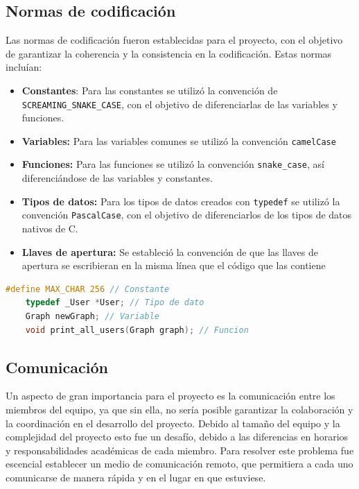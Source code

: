 \documentclass[9pt,letterpaper,onecolumn]{rho-class/rho}
\begin{document}
\subsection{Normas de codificación}
Las normas de codificación fueron establecidas para el proyecto, con el objetivo de garantizar la coherencia y la consistencia en la codificación. Estas normas incluían:

\begin{itemize}
	\item \textbf{Constantes}: Para las constantes se utilizó la convención de \texttt{SCREAMING\_SNAKE\_CASE}, con el objetivo de diferenciarlas de las variables y funciones.
	\item \textbf{Variables:} Para las variables comunes se utilizó la convención \texttt{camelCase}
	\item \textbf{Funciones:} Para las funciones se utilizó la convención \texttt{snake\_case}, así diferenciándose de las variables y constantes.
	\item \textbf{Tipos de datos:} Para los tipos de datos creados con \texttt{typedef} se utilizó la convención \texttt{PascalCase}, con el objetivo de diferenciarlos de los tipos de datos nativos de C.
	\item \textbf{Llaves de apertura:} Se estableció la convención de que las llaves de apertura se escribieran en la misma línea que el código que las contiene
\end{itemize}

\begin{lstlisting}[caption={Ejemplo de código, utilizando las normas de codificación}, label={lst:normas_codificacion}, language=C]
	#define MAX_CHAR 256 // Constante
	typedef _User *User; // Tipo de dato
	Graph newGraph; // Variable
	void print_all_users(Graph graph); // Funcion
\end{lstlisting}

\subsection{Comunicación}

Un aspecto de gran importancia para el proyecto es la comunicación entre los miembros del equipo, ya que sin ella, no sería posible garantizar la colaboración y la coordinación en el desarrollo del proyecto. Debido al tamaño del equipo y la complejidad del proyecto esto fue un desafío, debido a las diferencias en horarios y responsabilidades académicas de cada miembro. Para resolver este problema fue escencial establecer un medio de comunicación remoto, que permitiera a cada uno comunicarse de manera rápida y en el lugar en que estuviese.
\end{document}
